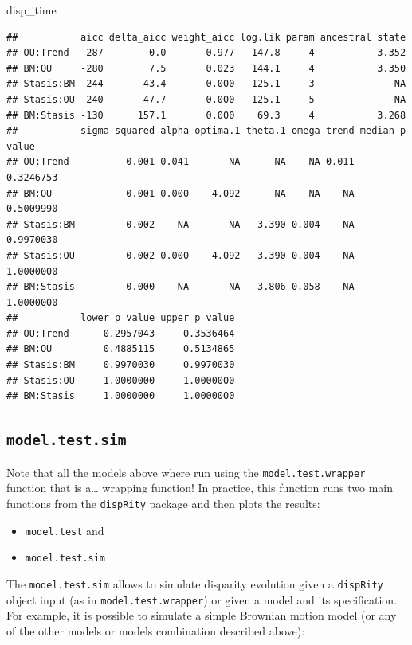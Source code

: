 \documentclass[
]{book}
\newenvironment{Shaded}{\begin{snugshade}}{\end{snugshade}}
\newcommand{\NormalTok}[1]{#1}
\providecommand{\tightlist}{%
  \setlength{\itemsep}{0pt}\setlength{\parskip}{0pt}}
\begin{document}
\begin{Shaded}
\begin{Highlighting}[]
\NormalTok{disp\_time}
\end{Highlighting}
\end{Shaded}

\begin{verbatim}
##           aicc delta_aicc weight_aicc log.lik param ancestral state
## OU:Trend  -287        0.0       0.977   147.8     4           3.352
## BM:OU     -280        7.5       0.023   144.1     4           3.350
## Stasis:BM -244       43.4       0.000   125.1     3              NA
## Stasis:OU -240       47.7       0.000   125.1     5              NA
## BM:Stasis -130      157.1       0.000    69.3     4           3.268
##           sigma squared alpha optima.1 theta.1 omega trend median p value
## OU:Trend          0.001 0.041       NA      NA    NA 0.011      0.3246753
## BM:OU             0.001 0.000    4.092      NA    NA    NA      0.5009990
## Stasis:BM         0.002    NA       NA   3.390 0.004    NA      0.9970030
## Stasis:OU         0.002 0.000    4.092   3.390 0.004    NA      1.0000000
## BM:Stasis         0.000    NA       NA   3.806 0.058    NA      1.0000000
##           lower p value upper p value
## OU:Trend      0.2957043     0.3536464
## BM:OU         0.4885115     0.5134865
## Stasis:BM     0.9970030     0.9970030
## Stasis:OU     1.0000000     1.0000000
## BM:Stasis     1.0000000     1.0000000
\end{verbatim}

\hypertarget{model.test.sim}{%
\subsection{\texorpdfstring{\texttt{model.test.sim}}{model.test.sim}}\label{model.test.sim}}

Note that all the models above where run using the \texttt{model.test.wrapper} function that is a\ldots{} wrapping function!
In practice, this function runs two main functions from the \texttt{dispRity} package and then plots the results:

\begin{itemize}
\tightlist
\item
  \texttt{model.test} and
\item
  \texttt{model.test.sim}
\end{itemize}

The \texttt{model.test.sim} allows to simulate disparity evolution given a \texttt{dispRity} object input (as in \texttt{model.test.wrapper}) or given a model and its specification.
For example, it is possible to simulate a simple Brownian motion model (or any of the other models or models combination described above):
\end{document}
